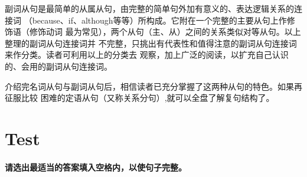 副词从句是最简单的从属从句，由完整的简单句外加有意义的、表达逻辑关系的连接词
（because、if、although等等）所构成。它附在一个完整的主要从句上作修饰语（修饰动词
最为常见），两个从句（主、从）之间的关系类似对等从句。以上整理的副词从句连接词并
不完整，只挑出有代表性和值得注意的副词从句连接词来作分类。读者可利用以上的分类去
观察，加上广泛的阅读，以扩充自己认识的、会用的副词从句连接词。

介绍完名词从句与副词从句后，相信读者已充分掌握了这两种从句的特色。如果再征服比较
困难的定语从句（又称关系分句）,就可以全盘了解复句结构了。

\section{Test}

\paragraph{请选出最适当的答案填入空格内，以使句子完整。}

